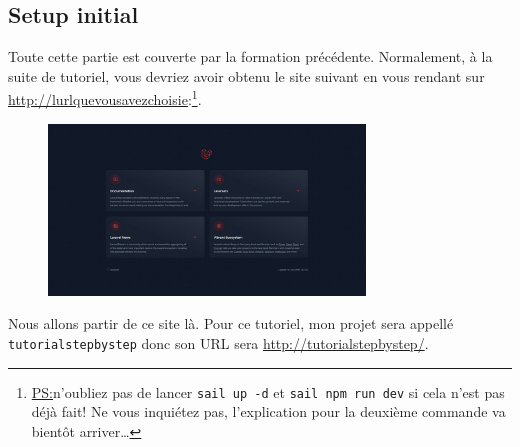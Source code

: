 \subsection{Setup initial}

Toute cette partie est couverte par la formation précédente. Normalement, à la suite de tutoriel, vous devriez avoir obtenu le site suivant en vous rendant sur \url{http://lurlquevousavezchoisie}:\footnote{\underline{PS:}n'oubliez pas de lancer \verb|sail up -d| et \verb|sail npm run dev| si cela n'est pas déjà fait! Ne vous inquiétez pas, l'explication pour la deuxième commande va bientôt arriver\ldots}.
\begin{figure}[!h]
    \centering
    \includegraphics[width=0.75\textwidth]{figures-C1/laravel_default_website.pdf}
\end{figure}
Nous allons partir de ce site là. Pour ce tutoriel, mon projet sera appellé \texttt{tutorialstepbystep} donc son URL sera \url{http://tutorialstepbystep/}.

